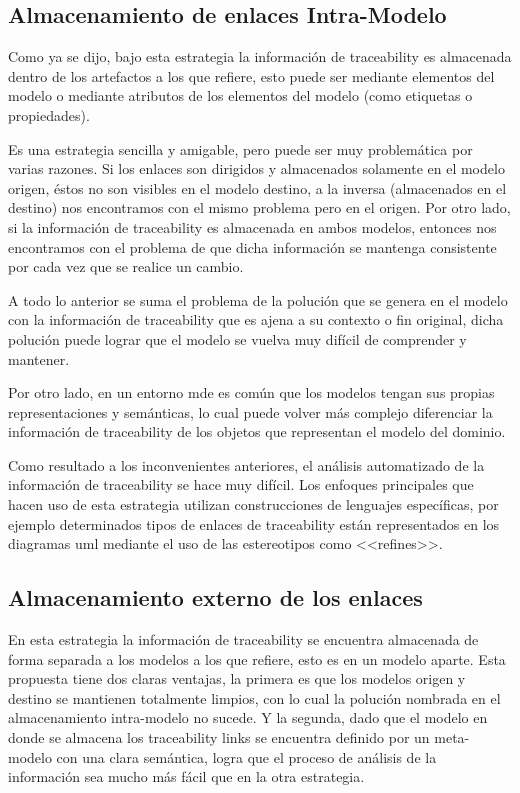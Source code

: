 \documentclass[a4paper,12pt,oneside,spanish]{book}
\begin{document}
\subsection{Almacenamiento de enlaces Intra-Modelo}

Como ya se dijo, bajo esta estrategia la información de traceability es almacenada dentro de los artefactos a los que refiere, esto puede ser mediante elementos del modelo o mediante atributos de los elementos del modelo (como etiquetas o propiedades).

Es una estrategia sencilla y amigable, pero puede ser muy problemática por varias razones. Si los enlaces son dirigidos y almacenados solamente en el modelo origen, éstos no son visibles en el modelo destino, a la inversa (almacenados en el destino) nos encontramos con el mismo problema pero en el origen. Por otro lado, si la información de traceability es almacenada en ambos modelos, entonces nos encontramos con el problema de que dicha información se mantenga consistente por cada vez que se realice un cambio.

A todo lo anterior se suma el problema de la polución que se genera en el modelo con la información de traceability que es ajena a su contexto o fin original, dicha polución puede lograr que el modelo se vuelva muy difícil de comprender y mantener.

Por otro lado, en un entorno \gls{mde} es común que los modelos tengan sus propias representaciones y semánticas, lo cual puede volver más complejo diferenciar la información de traceability de los objetos que representan el modelo del dominio.

Como resultado a los inconvenientes anteriores, el análisis automatizado de la información de traceability se hace muy difícil. Los enfoques principales que hacen uso de esta estrategia utilizan construcciones de lenguajes específicas, por ejemplo determinados tipos de enlaces de traceability están representados en los diagramas \gls{uml} mediante el uso de las estereotipos como <<refines>>.

\subsection{Almacenamiento externo de los enlaces}

En esta estrategia la información de traceability se encuentra almacenada de forma separada a los modelos a los que refiere, esto es en un modelo aparte. Esta propuesta tiene dos claras ventajas, la primera es que los modelos origen y destino se mantienen totalmente limpios, con lo cual la polución nombrada en el almacenamiento intra-modelo no sucede. Y la segunda, dado que el modelo en donde se almacena los traceability links se encuentra definido por un meta-modelo con una clara semántica, logra que el proceso de análisis de la información sea mucho más fácil que en la otra estrategia.
\end{document}
